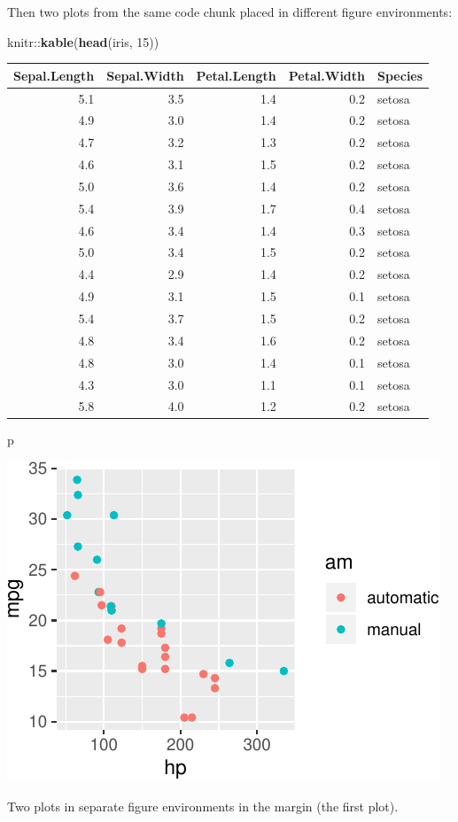\documentclass[]{tufte-handout}
\newenvironment{Shaded}{}{}
\newcommand{\KeywordTok}[1]{\textcolor[rgb]{0.00,0.44,0.13}{\textbf{#1}}}
\newcommand{\DecValTok}[1]{\textcolor[rgb]{0.25,0.63,0.44}{#1}}
\newcommand{\OperatorTok}[1]{\textcolor[rgb]{0.40,0.40,0.40}{#1}}
\newcommand{\NormalTok}[1]{#1}
\begin{document}
Then two plots from the same code chunk placed in different figure
environments:

\begin{Shaded}
\begin{Highlighting}[]
\NormalTok{knitr}\OperatorTok{::}\KeywordTok{kable}\NormalTok{(}\KeywordTok{head}\NormalTok{(iris, }\DecValTok{15}\NormalTok{))}
\end{Highlighting}
\end{Shaded}

\begin{longtable}[]{@{}rrrrl@{}}
\toprule
Sepal.Length & Sepal.Width & Petal.Length & Petal.Width &
Species\tabularnewline
\midrule
\endhead
5.1 & 3.5 & 1.4 & 0.2 & setosa\tabularnewline
4.9 & 3.0 & 1.4 & 0.2 & setosa\tabularnewline
4.7 & 3.2 & 1.3 & 0.2 & setosa\tabularnewline
4.6 & 3.1 & 1.5 & 0.2 & setosa\tabularnewline
5.0 & 3.6 & 1.4 & 0.2 & setosa\tabularnewline
5.4 & 3.9 & 1.7 & 0.4 & setosa\tabularnewline
4.6 & 3.4 & 1.4 & 0.3 & setosa\tabularnewline
5.0 & 3.4 & 1.5 & 0.2 & setosa\tabularnewline
4.4 & 2.9 & 1.4 & 0.2 & setosa\tabularnewline
4.9 & 3.1 & 1.5 & 0.1 & setosa\tabularnewline
5.4 & 3.7 & 1.5 & 0.2 & setosa\tabularnewline
4.8 & 3.4 & 1.6 & 0.2 & setosa\tabularnewline
4.8 & 3.0 & 1.4 & 0.1 & setosa\tabularnewline
4.3 & 3.0 & 1.1 & 0.1 & setosa\tabularnewline
5.8 & 4.0 & 1.2 & 0.2 & setosa\tabularnewline
\bottomrule
\end{longtable}

\begin{Shaded}
\begin{Highlighting}[]
\NormalTok{p}
\end{Highlighting}
\end{Shaded}

\begin{marginfigure}
\includegraphics{handout-twitter-analysis_files/figure-latex/fig-margin-separate-1} \caption[Two plots in separate figure environments in the margin (the first plot)]{Two plots in separate figure environments in the margin (the first plot).}\label{fig:fig-margin-separate1}
\end{marginfigure}
\end{document}

